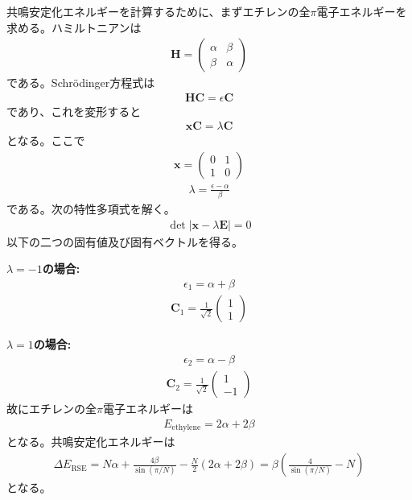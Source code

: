 \documentclass{jlreq}
\begin{document}
共鳴安定化エネルギーを計算するために、まずエチレンの全$\pi$電子エネルギーを求める。ハミルトニアンは
\begin{eqnarray}
    \mathbf{H}=
    \begin{pmatrix}
        \alpha & \beta \\
        \beta & \alpha
    \end{pmatrix}   
\end{eqnarray}  
である。Schr\"odinger方程式は
\begin{eqnarray}
    \mathbf{HC}=\epsilon\mathbf{C}
\end{eqnarray}  
であり、これを変形すると
\begin{eqnarray}
    \mathbf{xC}=\lambda\mathbf{C}
\end{eqnarray}
となる。ここで
\begin{eqnarray}
    \mathbf{x}=
    \begin{pmatrix}
        0 & 1 \\
        1 & 0
    \end{pmatrix}
\end{eqnarray}
\begin{eqnarray}
\lambda=\frac{\epsilon-\alpha}{\beta}
\end{eqnarray}  
である。次の特性多項式を解く。
\begin{eqnarray}
    \det|\mathbf{x}-\lambda\mathbf{E}|=0
\end{eqnarray}  
以下の二つの固有値及び固有ベクトルを得る。

\noindent
\textbf{$\lambda=-1$の場合:}\\
\begin{eqnarray}
    \epsilon_1=\alpha+\beta
\end{eqnarray}  
\begin{eqnarray}
    \mathbf{C}_1=\frac{1}{\sqrt{2}}
    \begin{pmatrix}
        1 \\
        1
    \end{pmatrix}   
\end{eqnarray}

\noindent   
\textbf{$\lambda=1$の場合:}\\ 
\begin{eqnarray}
    \epsilon_2=\alpha-\beta
\end{eqnarray}  
\begin{eqnarray}
    \mathbf{C}_2=\frac{1}{\sqrt{2}}
    \begin{pmatrix}
         1 \\
        -1
    \end{pmatrix}   
\end{eqnarray}
故にエチレンの全$\pi$電子エネルギーは
\begin{eqnarray}
    E_\text{ethylene}=2\alpha+2\beta
\end{eqnarray}  
となる。共鳴安定化エネルギーは
\begin{eqnarray}
    \Delta E_\text{RSE}=N\alpha+\frac{4\beta}{\sin(\pi/N)}-\frac{N}{2}\left(2\alpha+2\beta\right)=\beta\left(\frac{4}{\sin(\pi/N)}-N\right)
\end{eqnarray}
となる。
\end{document}

